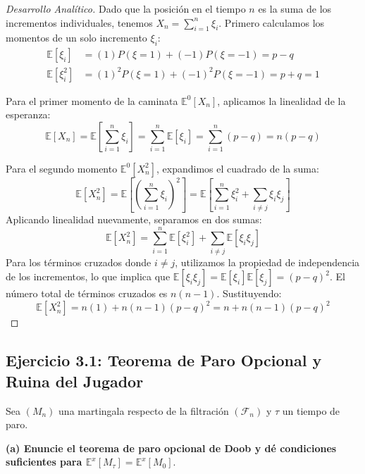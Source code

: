\documentclass[12pt, a4paper]{article}
\begin{document}
\begin{proof}[Desarrollo Analítico]
Dado que la posición en el tiempo $n$ es la suma de los incrementos individuales, tenemos $X_n = \sum_{i=1}^n \xi_i$. Primero calculamos los momentos de un solo incremento $\xi_i$:
\begin{align*}
    \mathbb{E}[\xi_i] &= (1)P(\xi=1) + (-1)P(\xi=-1) = p - q \\
    \mathbb{E}[\xi_i^2] &= (1)^2P(\xi=1) + (-1)^2P(\xi=-1) = p + q = 1
\end{align*}

Para el primer momento de la caminata $\mathbb{E}^0[X_n]$, aplicamos la linealidad de la esperanza:
$$ \mathbb{E}[X_n] = \mathbb{E}\left[\sum_{i=1}^n \xi_i\right] = \sum_{i=1}^n \mathbb{E}[\xi_i] = \sum_{i=1}^n (p-q) = n(p-q) $$

Para el segundo momento $\mathbb{E}^0[X_n^2]$, expandimos el cuadrado de la suma:
$$ \mathbb{E}[X_n^2] = \mathbb{E}\left[ \left(\sum_{i=1}^n \xi_i\right)^2 \right] = \mathbb{E}\left[ \sum_{i=1}^n \xi_i^2 + \sum_{i \neq j} \xi_i \xi_j \right] $$
Aplicando linealidad nuevamente, separamos en dos sumas:
$$ \mathbb{E}[X_n^2] = \sum_{i=1}^n \mathbb{E}[\xi_i^2] + \sum_{i \neq j} \mathbb{E}[\xi_i \xi_j] $$
Para los términos cruzados donde $i \neq j$, utilizamos la propiedad de independencia de los incrementos, lo que implica que $\mathbb{E}[\xi_i \xi_j] = \mathbb{E}[\xi_i]\mathbb{E}[\xi_j] = (p-q)^2$. El número total de términos cruzados es $n(n-1)$. Sustituyendo:
$$ \mathbb{E}[X_n^2] = n(1) + n(n-1)(p-q)^2 = n + n(n-1)(p-q)^2 $$
\end{proof}

\vspace{0.5cm}

\subsection{Ejercicio 3.1: Teorema de Paro Opcional y Ruina del Jugador}
Sea $(M_n)$ una martingala respecto de la filtración $(\mathcal{F}_n)$ y $\tau$ un tiempo de paro.

\vspace{0.3cm}
\noindent \textbf{(a) Enuncie el teorema de paro opcional de Doob y dé condiciones suficientes para $\mathbb{E}^x[M_\tau] = \mathbb{E}^x[M_0]$}.
\end{document}
